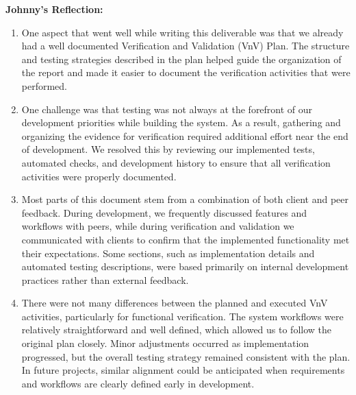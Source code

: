 \documentclass[12pt, titlepage]{article}
\begin{document}
\noindent\textbf{Johnny's Reflection:}
\begin{enumerate}

\item One aspect that went well while writing this deliverable was that we already had a well documented Verification and Validation (VnV) Plan. The structure and testing strategies described in the plan helped guide the organization of the report and made it easier to document the verification activities that were performed.

\item One challenge was that testing was not always at the forefront of our development priorities while building the system. As a result, gathering and organizing the evidence for verification required additional effort near the end of development. We resolved this by reviewing our implemented tests, automated checks, and development history to ensure that all verification activities were properly documented.

\item Most parts of this document stem from a combination of both client and peer feedback. During development, we frequently discussed features and workflows with peers, while during verification and validation we communicated with clients to confirm that the implemented functionality met their expectations. Some sections, such as implementation details and automated testing descriptions, were based primarily on internal development practices rather than external feedback.

\item There were not many differences between the planned and executed VnV activities, particularly for functional verification. The system workflows were relatively straightforward and well defined, which allowed us to follow the original plan closely. Minor adjustments occurred as implementation progressed, but the overall testing strategy remained consistent with the plan. In future projects, similar alignment could be anticipated when requirements and workflows are clearly defined early in development.

\end{enumerate}
\end{document}

